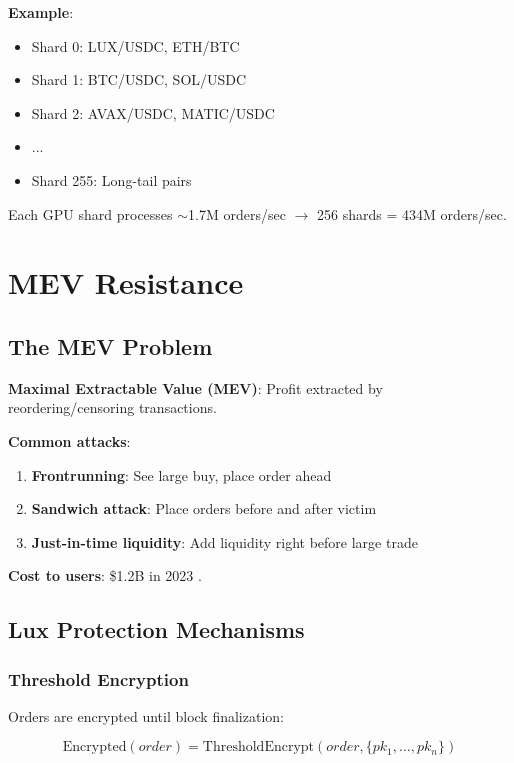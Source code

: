 \documentclass[11pt,letterpaper]{article}
\begin{document}
\textbf{Example}:
\begin{itemize}
    \item Shard 0: LUX/USDC, ETH/BTC
    \item Shard 1: BTC/USDC, SOL/USDC
    \item Shard 2: AVAX/USDC, MATIC/USDC
    \item ...
    \item Shard 255: Long-tail pairs
\end{itemize}

Each GPU shard processes $\sim$1.7M orders/sec $\to$ 256 shards = 434M orders/sec.

\section{MEV Resistance}

\subsection{The MEV Problem}

\textbf{Maximal Extractable Value (MEV)}: Profit extracted by reordering/censoring transactions.

\textbf{Common attacks}:
\begin{enumerate}
    \item \textbf{Frontrunning}: See large buy, place order ahead
    \item \textbf{Sandwich attack}: Place orders before and after victim
    \item \textbf{Just-in-time liquidity}: Add liquidity right before large trade
\end{enumerate}

\textbf{Cost to users}: \$1.2B in 2023 \cite{flashbots2024}.

\subsection{Lux Protection Mechanisms}

\subsubsection{Threshold Encryption}

Orders are encrypted until block finalization:

\begin{equation}
\text{Encrypted}(order) = \text{ThresholdEncrypt}(order, \{pk_1, \ldots, pk_n\})
\end{equation}
\end{document}
